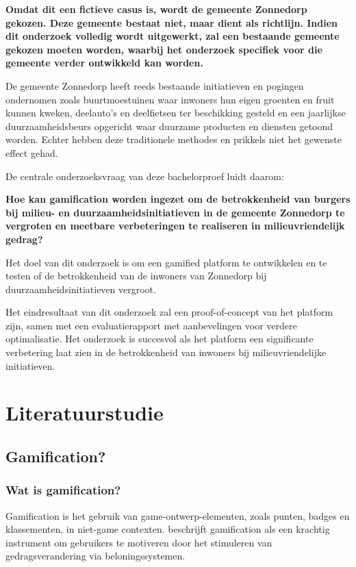 \documentclass{hogent-article}
\begin{document}
\textbf{Omdat dit een fictieve casus is, wordt de gemeente Zonnedorp gekozen. Deze gemeente bestaat niet, maar dient als richtlijn. Indien dit onderzoek volledig wordt uitgewerkt, zal een bestaande gemeente gekozen moeten worden, waarbij het onderzoek specifiek voor die gemeente verder ontwikkeld kan worden.} 

De gemeente Zonnedorp heeft reeds bestaande initiatieven en pogingen ondernomen zoals buurtmoestuinen waar inwoners hun eigen groenten en fruit kunnen kweken, deelauto's en deelfietsen ter beschikking gesteld en een jaarlijkse duurzaamheidsbeurs opgericht waar duurzame producten en diensten getoond worden. Echter hebben deze traditionele methodes en prikkels niet het gewenste effect gehad. 

De centrale onderzoeksvraag van deze bachelorproef luidt daarom: 

\textbf{Hoe kan gamification worden ingezet om de betrokkenheid van burgers bij milieu- en duurzaamheidsinitiatieven in de gemeente Zonnedorp te vergroten en meetbare verbeteringen te realiseren in milieuvriendelijk gedrag?}

Het doel van dit onderzoek is om een gamified platform te ontwikkelen en te testen of de betrokkenheid van de inwoners van Zonnedorp bij duurzaamheidsinitiatieven vergroot.

Het eindresultaat van dit onderzoek zal een proof-of-concept van het platform zijn, samen met een evaluatierapport met aanbevelingen voor verdere optimalisatie. Het onderzoek is succesvol als het platform een significante verbetering laat zien in de betrokkenheid van inwoners bij milieuvriendelijke initiatieven.

\section{Literatuurstudie}%
\label{sec:literatuurstudie}
\subsection{Gamification?}
\subsubsection{Wat is gamification?}
Gamification is het gebruik van game-ontwerp-elementen, zoals punten, badges en klassementen, in niet-game contexten. \autocite{Deterding2011} \textcite{Burke2016} beschrijft gamification als een krachtig instrument om gebruikers te motiveren door het stimuleren van gedragsverandering via beloningssystemen.
\end{document}
